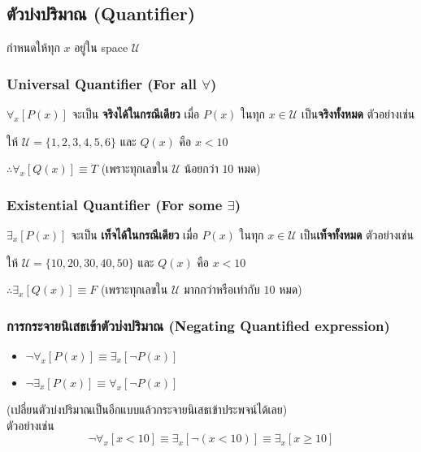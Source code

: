\documentclass[12pt,a4paper]{article}
\begin{document}
\subsection*{ตัวบ่งปริมาณ (Quantifier)}
\quad กำหนดให้ทุก $x$ อยู่ใน space $\mathcal{U}$

\subsubsection*{Universal Quantifier (For all $\forall$)}
$\forall_x\left[ P(x) \right]$ จะเป็น \textbf{จริงได้ในกรณีเดียว} เมื่อ $P(x)$ ในทุก $x \in \mathcal{U}$ เป็น\textbf{จริงทั้งหมด} ตัวอย่างเช่น \\
\rule{0pt}{2.5ex}

ให้ $\mathcal{U} = \{1,2,3,4,5,6\}$ และ $Q(x)$ คือ $x < 10$\\
\rule{0pt}{4ex}
$\therefore \forall_x[Q(x)] \equiv T$ (เพราะทุกเลขใน $\mathcal{U}$ น้อยกว่า $10$ หมด)

\subsubsection*{Existential Quantifier (For some $\exists$)}
$\exists_x\left[ P(x) \right]$ จะเป็น \textbf{เท็จได้ในกรณีเดียว} เมื่อ $P(x)$ ในทุก $x \in \mathcal{U}$ เป็น\textbf{เท็จทั้งหมด} ตัวอย่างเช่น \\
\rule{0pt}{2.5ex}

ให้ $\mathcal{U} = \{10,20,30,40,50\}$ และ $Q(x)$ คือ $x < 10$\\
\rule{0pt}{4ex}
$\therefore \exists_x[Q(x)] \equiv F$ (เพราะทุกเลขใน $\mathcal{U}$ มากกว่าหรือเท่ากับ $10$ หมด)

\subsubsection*{การกระจายนิเสธเข้าตัวบ่งปริมาณ (Negating Quantified expression)}
\begin{itemize}
    \item $\neg\forall_x[P(x)] \equiv \exists_x[\neg P(x)]$
    \item $\neg\exists_x[P(x)] \equiv \forall_x[\neg P(x)]$
\end{itemize}
(เปลี่ยนตัวบ่งปริมาณเป็นอีกแบบแล้วกระจายนิเสธเข้าประพจน์ได้เลย) \\
ตัวอย่างเช่น \\
$$
    \neg \forall_x[x < 10] \equiv \exists_x[\neg( x < 10)] \equiv \exists_x[x \ge 10]
$$
\end{document}

